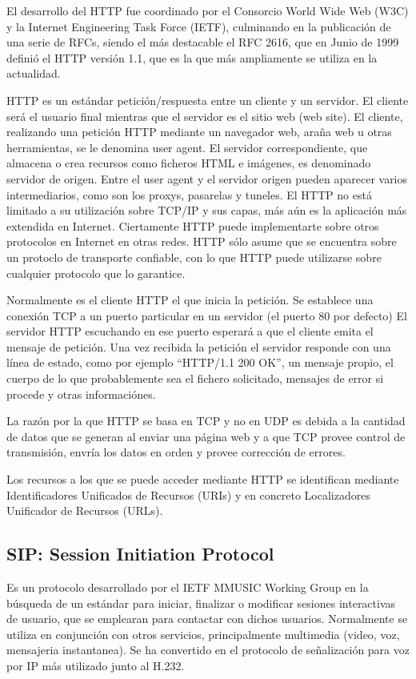 \documentclass[a4paper,spanish,12pt]{book}
\begin{document}
El desarrollo del HTTP fue coordinado por el Consorcio World Wide Web (W3C) y la Internet Engineering Task Force (IETF), culminando en la publicación de una serie de RFCs, siendo el más destacable el RFC 2616, que en Junio de 1999 definió el HTTP versión 1.1, que es la que más ampliamente se utiliza en la actualidad.

HTTP es un estándar petición/respuesta entre un cliente y un servidor. El cliente será el usuario final mientras que el servidor es el sitio web (web site). El cliente, realizando una petición HTTP mediante un navegador web, araña web u otras herramientas, se le denomina user agent. El servidor correspondiente, que almacena o crea recursos como ficheros HTML e imágenes, es denominado servidor de origen. Entre el user agent y el servidor origen pueden aparecer varios intermediarios, como son los proxys, pasarelas y tuneles. El HTTP no está limitado a su utilización sobre TCP/IP y sus capas, más aún es la aplicación más extendida en Internet. Ciertamente HTTP puede implementarte sobre otros protocolos en Internet en otras redes. HTTP sólo asume que se encuentra sobre un protoclo de transporte confiable, con lo que HTTP puede utilizarse sobre cualquier protocolo que lo garantice.

Normalmente es el cliente HTTP el que inicia la petición. Se establece una conexión TCP a un puerto particular en un servidor (el puerto 80 por defecto) El servidor HTTP escuchando en ese puerto esperará a que el cliente emita el mensaje de petición. Una vez recibida la petición el servidor responde con una línea de estado, como por ejemplo ``HTTP/1.1 200 OK'',  un mensaje propio, el cuerpo de lo que probablemente sea el fichero solicitado, mensajes de error si procede y otras informaciónes.

La razón por la que HTTP se basa en TCP y no en UDP es debida a la cantidad de datos que se generan al enviar una página web y a que TCP provee control de transmisión, envría los datos en orden y provee corrección de errores.

Los recursos a los que se puede acceder mediante HTTP se identifican mediante Identificadores Unificados de Recursos (URIs) y en concreto Localizadores Unificador de Recursos (URLs).


\subsection{SIP: Session Initiation Protocol} 

Es un protocolo desarrollado por el IETF MMUSIC Working Group en la búsqueda de un estándar para iniciar, finalizar o modificar sesiones interactivas de usuario, que se emplearan para contactar con dichos usuarios. Normalmente se utiliza en conjunción con otros servicios, principalmente multimedia (video, voz, mensajeria instantanea). Se ha convertido en el protocolo de señalización para voz por IP más utilizado junto al H.232.
\end{document}

